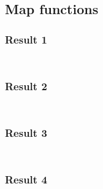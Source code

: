 \subsection{Map functions}
\subsubsection{Result 1}
\label{result-1-map}
\begin{verbatim}
\end{verbatim}
\label{result-1-list}
\begin{verbatim}
\end{verbatim}

\subsubsection{Result 2}
\label{result-2-map}
\begin{verbatim}
\end{verbatim}
\label{result-2-list}
\begin{verbatim}
\end{verbatim}

\subsubsection{Result 3}
\label{result-3-map}
\begin{verbatim}
\end{verbatim}
\label{result-3-list}
\begin{verbatim}
\end{verbatim}

\subsubsection{Result 4}
\label{result-4-map}
\begin{verbatim}
\end{verbatim}
\label{result-4-list}
\begin{verbatim}
\end{verbatim}
